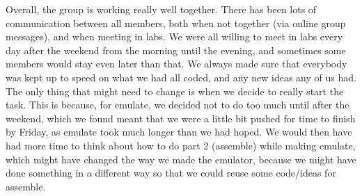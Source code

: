\documentclass[a4wide, 10pt]{article}
\begin{document}
Overall, the group is working really well together. There has been lots of
 communication between all members, both when not together (via online group messages),
  and when meeting in labs. We were all willing to meet in labs every day after the
   weekend from the morning until the evening, and sometimes some members would stay
    even later than that. We always made sure that everybody was kept up to speed on
     what we had all coded, and any new ideas any of us had. The only thing that might
      need to change is when we decide to really start the task. This is because, for
       emulate, we decided not to do too much until after the weekend, which we found
        meant that we were a little bit pushed for time to finish by Friday, as emulate
         took much longer than we had hoped. We would then have had more time to think
          about how to do part 2 (assemble) while making emulate, which might have
           changed the way we made the emulator, because we might have done something
            in a different way so that we could reuse some code/ideas for assemble.
            
\end{document}
